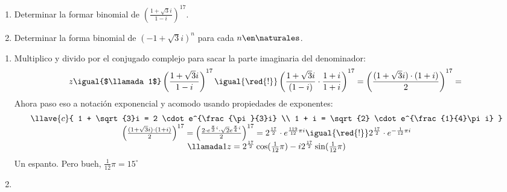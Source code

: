\begin{enunciado}{\ejercicio}
  \begin{enumerate}[label=\alph*)]
    \item Determinar la formar binomial de
          $ \left(\frac{1 + \sqrt{3} i }{1 - i} \right)^{17}$.

    \item Determinar la forma binomial de
          $(-1 + \sqrt{3}i)^n$ para cada $n \en \naturales$.
  \end{enumerate}
\end{enunciado}

\begin{enumerate}[label=\alph*)]
  \item  Multiplico y divido por el conjugado complejo para sacar la parte imaginaria del denominador:
        $$
          z \igual{$\llamada1$} \left(\frac{1 + \sqrt{3} i }{1 - i} \right)^{17} \igual{\red{!}}
          \left(\frac{1 + \sqrt{3} i }{(1 - i)}\cdot \frac{1+i}{1+i} \right)^{17} =
          \left( \frac{(1 + \sqrt{3} i) \cdot (1+i) }{2} \right)^{17} =             \\
        $$
        Ahora paso eso a notación exponencial y acomodo usando propiedades de exponentes:
        $$
          \begin{array}{c}
            \llave{c}{
            1 + \sqrt{3}i = 2 \cdot e^{\frac{\pi}{3}i}     \\
              1 + i = \sqrt{2} \cdot e^{\frac{1}{4}\pi i}
            }                                              \\
            \left( \frac{(1 + \sqrt{3} i) \cdot (1+i) }{2} \right)^{17} =
            \left( \frac{{2 \cdot e^{\frac{\pi}{3}i} } \cdot \sqrt{2} e^{\frac{\pi}{4}i}}{2} \right)^{17} =
            2^{\frac{17}{2}} \cdot  e^{\frac{119}{12}\pi i}  \igual{\red{!}}
            2^{\frac{17}{2}} \cdot  e^{-\frac{1}{12}\pi i} \\
            \llamada1 z =  2^{\frac{17}{2}}  \cos(\frac{1}{12} \pi) - i 2^{\frac{17}{2}} \sin(\frac{1}{12} \pi)
          \end{array}
        $$
        Un espanto. Pero bueh, $\frac{1}{12}\pi = 15^\circ$

  \item \hacer
\end{enumerate}
